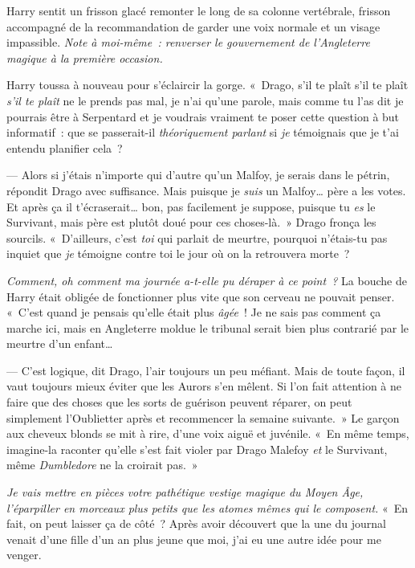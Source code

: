 Harry sentit un frisson glacé remonter le long de sa colonne vertébrale, frisson accompagné de la recommandation de garder une voix normale et un visage impassible.
\emph{Note à moi-même~: renverser le gouvernement de l'Angleterre magique à la première occasion.}

Harry toussa à nouveau pour s'éclaircir la gorge.
«~Drago, s'il te plaît s'il te plaît \emph{s'il te plaît} ne le prends pas mal, je n'ai qu'une parole, mais comme tu l'as dit je pourrais être à Serpentard et je voudrais vraiment te poser cette question à but informatif~: que se passerait-il \emph{théoriquement parlant} si \emph{je} témoignais que je t'ai entendu planifier cela~?

--- Alors si j'étais n'importe qui d'autre qu'un Malfoy, je serais dans le pétrin, répondit Drago avec suffisance.
Mais puisque je \emph{suis} un Malfoy… père a les votes.
Et après ça il t'écraserait… bon, pas facilement je suppose, puisque tu \emph{es} le Survivant, mais père est plutôt doué pour ces choses-là.~»
Drago fronça les sourcils. «~D'ailleurs, c'est \emph{toi} qui parlait de meurtre, pourquoi n'étais-tu pas inquiet que \emph{je} témoigne contre toi le jour où on la retrouvera morte~?

\emph{Comment, oh comment ma journée a-t-elle pu déraper à ce point~?}
La bouche de Harry était obligée de fonctionner plus vite que son cerveau ne pouvait penser.
«~C'est quand je pensais qu'elle était plus \emph{âgée}~! Je ne sais pas comment ça marche ici, mais en Angleterre moldue le tribunal serait bien plus contrarié par le meurtre d'un enfant…

--- C'est logique, dit Drago, l'air toujours un peu méfiant.
Mais de toute façon, il vaut toujours mieux éviter que les Aurors s'en mêlent.
Si l'on fait attention à ne faire que des choses que les sorts de guérison peuvent réparer, on peut simplement l'Oublietter après et recommencer la semaine suivante.~»
Le garçon aux cheveux blonds se mit à rire, d'une voix aiguë et juvénile.
«~En même temps, imagine-la raconter qu'elle s'est fait violer par Drago Malefoy \emph{et} le Survivant, même \emph{Dumbledore} ne la croirait pas.~»

\emph{Je vais mettre en pièces votre pathétique vestige magique du Moyen Âge, l'éparpiller en morceaux plus petits que les atomes mêmes qui le composent.}
«~En fait, on peut laisser ça de côté~? Après avoir découvert que la une du journal venait d'une fille d'un an plus jeune que moi, j'ai eu une autre idée pour me venger.

